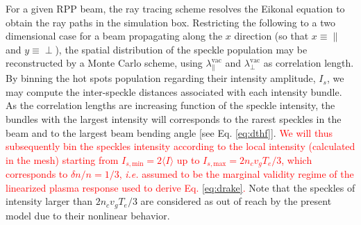 \documentclass[%
 reprint,
 amsmath,amssymb,
 aps,
]{revtex4-1}
\begin{document}
 For a given RPP beam, the ray tracing scheme resolves the Eikonal equation to obtain the ray paths in the simulation box.
Restricting the following to a two dimensional case for a beam propagating along the $x$ direction (so that $x\equiv \parallel$ and $y\equiv \perp$), the spatial distribution of the speckle population may be reconstructed by a Monte Carlo scheme, using  $\lambda^\mathrm{vac}_\parallel$ and $\lambda^\mathrm{vac}_\perp$ as correlation length.
By binning the hot spots population regarding their intensity amplitude, $I_{s}$, we may compute the inter-speckle distances 
associated with each intensity bundle.
As the correlation lengths are increasing function of the speckle intensity, the bundles with the largest intensity will corresponds to the rarest speckles in the beam and to the largest beam bending angle [see Eq. \eqref{eq:dthf}].
\textcolor{red}{
We will thus subsequently  bin the speckles intensity according to the local intensity (calculated in the mesh) starting from $I_{s,\mathrm{min}} =  2 \langle I \rangle$ up to  $I_{s,\mathrm{max}} =  2n_c v_gT_e/3$, which corresponds to $\delta n/n =1/3$, 
\emph{i.e.} assumed to be the marginal  validity regime of the linearized plasma response used to derive Eq. \eqref{eq:drake}. 
}
Note that the speckles of  intensity larger than  $ 2n_c v_gT_e/3$ are considered as out of reach by the present model due to their nonlinear behavior. %
\end{document}
